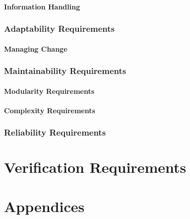 \documentclass[11pt]{article}
\begin{document}
\subsection{Information Handling}
\section{Adaptability Requirements}
\subsection{Managing Change}
\section{Maintainability Requirements}
\subsection{Modularity Requirements}
\subsection{Complexity Requirements}
\section{Reliability Requirements}

\newpage
\part{Verification Requirements}


\newpage
\part{Appendices}
\end{document}
